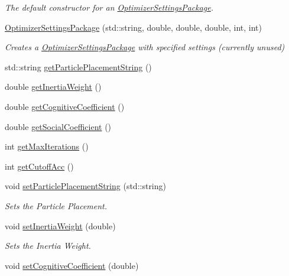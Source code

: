 \begin{DoxyCompactItemize}
\begin{DoxyCompactList}\small\item\em The default constructor for an \hyperlink{class_optimizer_settings_package}{Optimizer\+Settings\+Package}. \end{DoxyCompactList}\item 
\hyperlink{class_optimizer_settings_package_a88816e4c428f667ecc6f705914fae6e6}{Optimizer\+Settings\+Package} (std\+::string, double, double, double, int, int)
\begin{DoxyCompactList}\small\item\em Creates a \hyperlink{class_optimizer_settings_package}{Optimizer\+Settings\+Package} with specified settings (currently unused) \end{DoxyCompactList}\item 
std\+::string \hyperlink{class_optimizer_settings_package_a0aef1b99ba5028bc5dc7724f987d7ec8}{get\+Particle\+Placement\+String} ()
\item 
double \hyperlink{class_optimizer_settings_package_af914190cf768d01151748918824caadc}{get\+Inertia\+Weight} ()
\item 
double \hyperlink{class_optimizer_settings_package_af760320d4abd50d7202d174064c0081d}{get\+Cognitive\+Coefficient} ()
\item 
double \hyperlink{class_optimizer_settings_package_a1c9c6216fdc974d98240a0ed5a935ab5}{get\+Social\+Coefficient} ()
\item 
int \hyperlink{class_optimizer_settings_package_a222941151a918db93f03c6324bf7b470}{get\+Max\+Iterations} ()
\item 
int \hyperlink{class_optimizer_settings_package_a72c8309b58d3fd636dc4b63c775d6499}{get\+Cutoff\+Acc} ()
\item 
void \hyperlink{class_optimizer_settings_package_adec7fd22b8ab361a3178be9d38e7c70c}{set\+Particle\+Placement\+String} (std\+::string)
\begin{DoxyCompactList}\small\item\em Sets the Particle Placement. \end{DoxyCompactList}\item 
void \hyperlink{class_optimizer_settings_package_a00f4ac2ec3d1b11b2c0c056dc20e902b}{set\+Inertia\+Weight} (double)
\begin{DoxyCompactList}\small\item\em Sets the Inertia Weight. \end{DoxyCompactList}\item 
void \hyperlink{class_optimizer_settings_package_a5af2e5d9a2b5f7f344e7f840b609c33f}{set\+Cognitive\+Coefficient} (double)

\end{DoxyCompactItemize}
